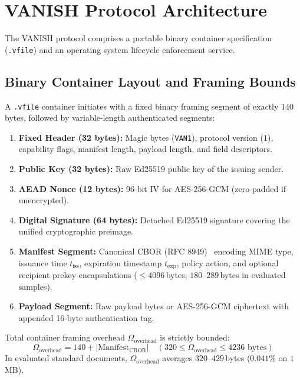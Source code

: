 \section{VANISH Protocol Architecture}
\label{sec:protocol}

The VANISH protocol comprises a portable binary container specification (\texttt{.vfile}) and an operating system lifecycle enforcement service.

\subsection{Binary Container Layout and Framing Bounds}
A \texttt{.vfile} container initiates with a fixed binary framing segment of exactly $140$\,bytes, followed by variable-length authenticated segments:
\begin{enumerate}
    \item \textbf{Fixed Header (32 bytes):} Magic bytes (\texttt{VAN1}), protocol version ($1$), capability flags, manifest length, payload length, and field descriptors.
    \item \textbf{Public Key (32 bytes):} Raw Ed25519 public key of the issuing sender.
    \item \textbf{AEAD Nonce (12 bytes):} 96-bit IV for AES-256-GCM (zero-padded if unencrypted).
    \item \textbf{Digital Signature (64 bytes):} Detached Ed25519 signature covering the unified cryptographic preimage.
    \item \textbf{Manifest Segment:} Canonical CBOR (RFC 8949)~\cite{rfc8949cbor} encoding MIME type, issuance time $t_{\text{iss}}$, expiration timestamp $t_{\text{exp}}$, policy action, and optional recipient prekey encapsulations ($\le 4096$\,bytes; $180$--$289$\,bytes in evaluated samples).
    \item \textbf{Payload Segment:} Raw payload bytes or AES-256-GCM ciphertext with appended 16-byte authentication tag.
\end{enumerate}

Total container framing overhead $\Omega_{\text{overhead}}$ is strictly bounded:
\begin{equation}
    \Omega_{\text{overhead}} = 140 + |\text{Manifest}_{\text{CBOR}}| \quad (320 \le \Omega_{\text{overhead}} \le 4236 \text{ bytes})
\end{equation}
In evaluated standard documents, $\Omega_{\text{overhead}}$ averages $320$--$429$\,bytes ($0.041\%$ on $1$\,MB).


